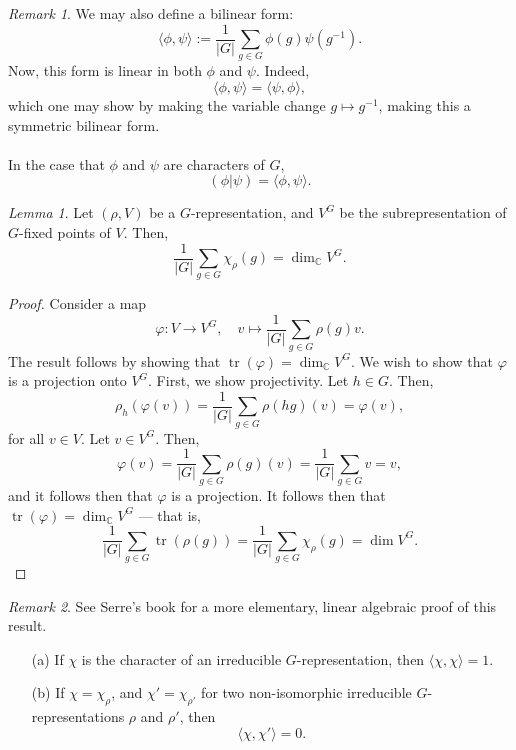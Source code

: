 \documentclass[a4paper]{report}
\theoremstyle{definition}
\theoremstyle{remark}
\newtheorem{remark}{Remark}
\theoremstyle{proposition}
\theoremstyle{conjecture}
\theoremstyle{lemma}
\newtheorem{lemma}{Lemma}
\theoremstyle{corollary}
\theoremstyle{exercise}
\theoremstyle{example}
\newcommand{\C}{\mathbb{C}}
\newcommand{\on}{\operatorname}
\begin{document}
\begin{remark}
    We may also define a bilinear form:
    $$\langle \phi,\psi\rangle :=\frac{1}{\vert G \vert} \sum_{g\in G} \phi(g)\psi(g^{-1}).$$
    Now, this form is linear in both $\phi$ and $\psi$. Indeed, 
    $$\langle \phi,\psi\rangle = \langle \psi,\phi\rangle,$$ which one may show 
    by making the variable change $g\mapsto g^{-1}$, making this 
    a symmetric bilinear form. \\\\
    In the case that $\phi$ and $\psi$ are characters of $G$,
    $$(\phi\vert\psi) = \langle\phi,\psi\rangle.$$
\end{remark}

\begin{lemma}\label{lemma_fixed_pt_dim}
    Let $(\rho,V)$ be a $G$-representation, and $V^G$ be the subrepresentation
    of $G$-fixed points of $V$. Then, 
    $$\frac{1}{\vert G \vert} \sum_{g\in G}\chi_\rho(g) = \dim_\C V^G.$$
\end{lemma}

\begin{proof}
    Consider a map 
    $$\varphi : V \longrightarrow V^G,\quad v \longmapsto \frac{1}{\vert G\vert}\sum_{g\in G} \rho(g)v.$$
    The result follows by showing that $\on{tr}(\varphi) = \dim_\C V^G$. 
    We wish to show that $\varphi$ is a projection onto $V^G$. 
    First, we show projectivity. Let $h \in G$.
    Then, $$\rho_h(\varphi(v)) = \frac{1}{\vert G \vert}\sum_{g\in G}\rho(hg)(v) = \varphi(v),$$
    for all $v\in V$. Let $v \in V^G$. Then,
    $$\varphi(v) = \frac{1}{\vert G \vert} \sum_{g\in G} \rho(g)(v) = \frac{1}{\vert G \vert} \sum_{g \in G} v = v,$$
    and it follows then that $\varphi$ is a projection. It follows then that 
    $\on{tr}(\varphi) = \dim_\C V^G$ --- that is, 
    $$\frac{1}{\vert G \vert} \sum_{g \in G} \on{tr}(\rho(g)) = \frac{1}{\vert G\vert}\sum_{g\in G} \chi_\rho(g) = \dim V^G.$$
\end{proof}

\begin{remark}
    See Serre's book for a more elementary, linear algebraic proof of this
    result.
\end{remark}

\begin{theorem}
    \leavevmode
    \begin{itemize}
        \item[(a)] If $\chi$ is the character of an irreducible 
            $G$-representation, then $\langle\chi,\chi\rangle = 1$. 
        \item[(b)] If $\chi = \chi_\rho$, and $\chi' = \chi_{\rho'}$ 
            for two non-isomorphic irreducible $G$-representations 
            $\rho$ and $\rho'$, then $$\langle \chi,\chi'\rangle = 0.$$
    \end{itemize}
\end{theorem}
\end{document}
